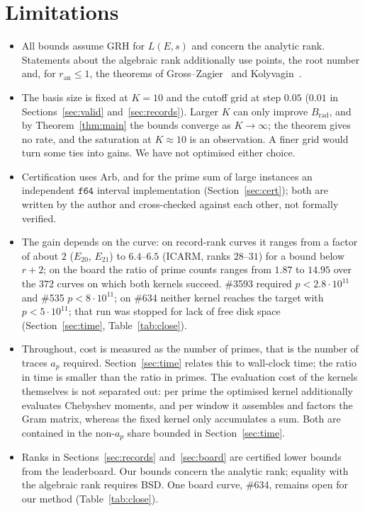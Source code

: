 \documentclass[11pt]{amsart}
\theoremstyle{remark}
\theoremstyle{definition}
\newcommand{\ran}{r_{\mathrm{an}}}
\begin{document}
\section{Limitations}
\begin{itemize}
\item All bounds assume GRH for $L(E,s)$ and concern the analytic rank. Statements about the algebraic rank additionally use points, the root number and, for $\ran\le1$, the theorems of Gross--Zagier~\cite{GZ} and Kolyvagin~\cite{Kolyvagin}.
\item The basis size is fixed at $K=10$ and the cutoff grid at step $0.05$ ($0.01$ in Sections~\ref{sec:valid} and~\ref{sec:records}). Larger $K$ can only improve $B_{\mathrm{rad}}$, and by Theorem~\ref{thm:main} the bounds converge as $K\to\infty$; the theorem gives no rate, and the saturation at $K\approx10$ is an observation. A finer grid would turn some ties into gains. We have not optimised either choice.
\item Certification uses Arb, and for the prime sum of large instances an independent $\mathtt{f64}$ interval implementation (Section~\ref{sec:cert}); both are written by the author and cross-checked against each other, not formally verified.
\item The gain depends on the curve: on record-rank curves it ranges from a factor of about $2$ ($E_{20}$, $E_{21}$) to $6.4$--$6.5$ (ICARM, ranks $28$--$31$) for a bound below $r+2$; on the board the ratio of prime counts ranges from $1.87$ to $14.95$ over the $372$ curves on which both kernels succeed. \#3593 required $p<2.8\cdot10^{11}$ and \#535 $p<8\cdot10^{11}$; on \#634 neither kernel reaches the target with $p<5\cdot10^{11}$; that run was stopped for lack of free disk space (Section~\ref{sec:time}, Table~\ref{tab:close}).
\item Throughout, cost is measured as the number of primes, that is the number of traces $a_p$
required. Section~\ref{sec:time} relates this to wall-clock time; the ratio in time is smaller
than the ratio in primes. The evaluation cost of the kernels themselves is not separated out:
per prime the optimised kernel additionally evaluates Chebyshev moments, and per window it
assembles and factors the Gram matrix, whereas the fixed kernel only accumulates a sum. Both
are contained in the non-$a_p$ share bounded in Section~\ref{sec:time}.
\item Ranks in Sections~\ref{sec:records} and~\ref{sec:board} are certified lower bounds from the leaderboard. Our bounds concern the analytic rank; equality with the algebraic rank requires BSD. One board curve, \#634, remains open for our method (Table~\ref{tab:close}).
\end{itemize}
\end{document}
